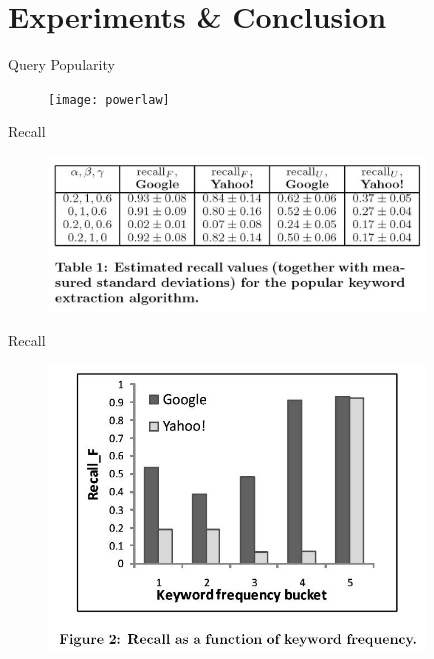 \documentclass{beamer}
\begin{document}
\section{Experiments \& Conclusion}
    \begin{frame}[plain]{Query Popularity}
        \begin{figure}
        \texttt{[image: powerlaw]}
        \end{figure}
    \end{frame}

    \begin{frame}[plain]{Recall}
        \begin{figure}
        \includegraphics[width=100mm]{t1}
        \end{figure}
    \end{frame}

    \begin{frame}[plain]{Recall}
        \begin{figure}
        \includegraphics[width=100mm]{f2}
        \end{figure}
    \end{frame}
\end{document}
